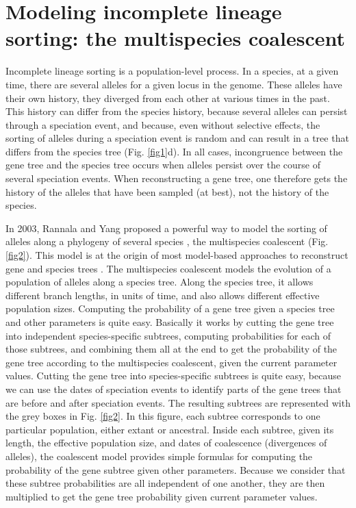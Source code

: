 \section{Modeling incomplete lineage sorting: the multispecies coalescent}
Incomplete lineage sorting is a population-level process.
In a species, at a given time, there are several alleles for a given locus in the genome.
These alleles have their own history, they diverged from each other at various times in the past.
This history can differ from the species history, because several alleles can persist through a speciation event, and because, even without selective effects, the sorting of alleles during a speciation event is random and can result in a tree that differs from the species tree (Fig. \ref{fig1}d).
In all cases, incongruence between the gene tree and the species tree occurs when alleles persist over the course of several speciation events.
When reconstructing a gene tree, one therefore gets the history of the alleles that have been sampled (at best), not the history of the species. 

In 2003, Rannala and Yang proposed a powerful way to model the sorting of alleles along a phylogeny of several species \citep{Rannala2003}, the multispecies coalescent (Fig. \ref{fig2}).
This model is at the origin of most model-based approaches to reconstruct gene and species trees \citep{Edwards2007,Heled2010}.
The multispecies coalescent models the evolution of a population of alleles along a species tree.
Along the species tree, it allows different branch lengths, in units of time, and also allows different effective population sizes.
Computing the probability of a gene tree given a species tree and other parameters is quite easy.
Basically it works by cutting the gene tree into independent species-specific subtrees, computing probabilities for each of those subtrees, and combining them all at the end to get the probability of the gene tree according to the multispecies coalescent, given the current parameter values.
Cutting the gene tree into species-specific subtrees is quite easy, because we can use the dates of speciation events to identify parts of the gene trees that are before and after speciation events. 
The resulting subtrees are represented with the grey boxes in Fig. \ref{fig2}.
In this figure, each subtree corresponds to one particular population, either extant or ancestral.
Inside each subtree, given its length, the effective population size, and dates of coalescence (divergences of alleles), the coalescent model provides simple formulas for computing the probability of the gene subtree given other parameters.
Because we consider that these subtree probabilities are all independent of one another, they are then multiplied to get the gene tree probability given current parameter values.
 
